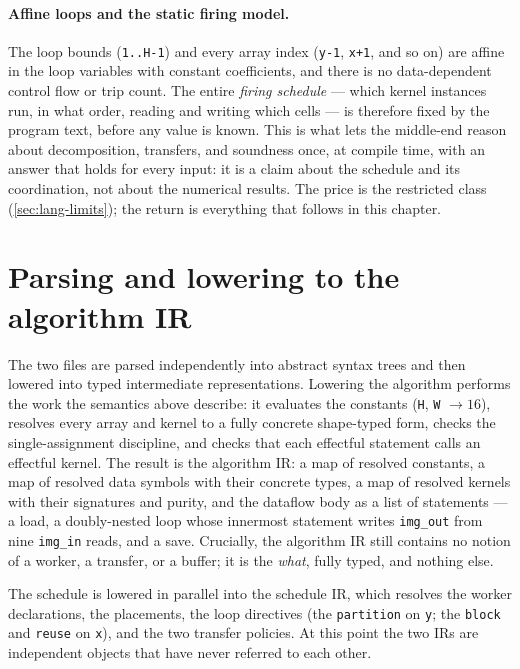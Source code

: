 \paragraph{Affine loops and the static firing model.} The loop bounds
(\texttt{1..H-1}) and every array index (\texttt{y-1}, \texttt{x+1}, and so on) are
affine in the loop variables with constant coefficients, and there is no
data-dependent control flow or trip count. The entire \emph{firing schedule} ---
which kernel instances run, in what order, reading and writing which cells --- is
therefore fixed by the program text, before any value is known. This is what lets
the middle-end reason about decomposition, transfers, and soundness once, at compile
time, with an answer that holds for every input: it is a claim about the schedule
and its coordination, not about the numerical results. The price is the restricted
class (\cref{sec:lang-limits}); the return is everything that follows in this chapter.

\section{Parsing and lowering to the algorithm IR}\label{sec:wt-algoir}

The two files are parsed independently into abstract syntax trees and then lowered
into typed intermediate representations. Lowering the algorithm performs the work
the semantics above describe: it evaluates the constants (\texttt{H}, \texttt{W}
$\rightarrow 16$), resolves every array and kernel to a fully concrete shape-typed
form, checks the single-assignment discipline, and checks that each effectful
statement calls an effectful kernel. The result is the algorithm IR: a map of
resolved constants, a map of resolved data symbols with their concrete types, a map
of resolved kernels with their signatures and purity, and the dataflow body as a
list of statements --- a load, a doubly-nested loop whose innermost statement writes
\texttt{img\_out} from nine \texttt{img\_in} reads, and a save. Crucially, the
algorithm IR still contains no notion of a worker, a transfer, or a buffer; it is
the \emph{what}, fully typed, and nothing else.

The schedule is lowered in parallel into the schedule IR, which resolves the worker
declarations, the placements, the loop directives (the \texttt{partition} on
\texttt{y}; the \texttt{block} and \texttt{reuse} on \texttt{x}), and the two
transfer policies. At this point the two IRs are independent objects that have
never referred to each other.

